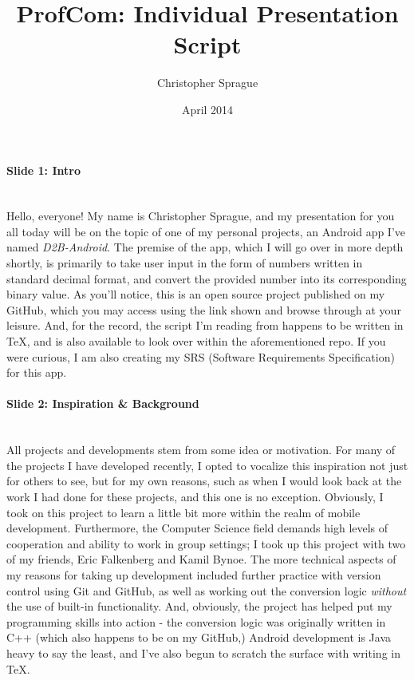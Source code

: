 \documentclass{article}
\title{ProfCom: Individual Presentation Script}
\author{Christopher Sprague}
\date{April 2014}
\begin{document}
\maketitle
\thispagestyle{empty}
\paragraph{Slide 1: Intro} ~\\

Hello, everyone! My name is Christopher Sprague, and my presentation for 
you all today will be on the topic of one of my personal projects, an 
Android app I've named \emph{D2B-Android}. The premise of the app, which I will
go over in more depth shortly, is primarily to take user input in the
form of numbers written in standard decimal format, and convert the provided 
number into its corresponding binary value. As you'll notice, this is an 
open source project published on my GitHub, which you may access using the 
link shown and browse through at your leisure. And, for the record, the script 
I'm reading from happens to be written in \TeX{}, and is also available to look
over within the aforementioned repo. If you were curious, I am also creating
my SRS (Software Requirements Specification) for this app.
\paragraph{Slide 2: Inspiration \& Background} ~\\

All projects and developments stem from some idea or motivation. For many of
the projects I have developed recently, I opted to vocalize this inspiration
not just for others to see, but for my own reasons, such as
when I would look back at the work I had done for these projects, and this
one is no exception. Obviously, I took on this project to learn a little bit
more within the realm of mobile development. Furthermore, the Computer Science
field demands high levels of cooperation and ability to work in group settings;
I took up this project with two of my friends, Eric Falkenberg and Kamil Bynoe.
The more technical aspects of my reasons for taking up development included
further practice with version control using Git and GitHub, as well as working
out the conversion logic \emph{without} the use of built-in functionality.
And, obviously, the project has helped put my programming skills into action -
the conversion logic was originally written in C++ (which also happens to be
on my GitHub,) Android development is Java heavy to say the least, and
I've also begun to scratch the surface with writing in \TeX{}.
\end{document}
